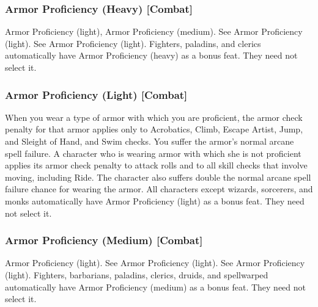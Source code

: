 \subsubsection{Armor Proficiency (Heavy) [Combat]}
 Armor Proficiency (light), Armor Proficiency (medium).
 See Armor Proficiency (light).
 See Armor Proficiency (light).
 Fighters, paladins, and clerics automatically have Armor Proficiency (heavy) as a bonus feat. They need not select it.

\subsubsection{Armor Proficiency (Light) [Combat]}
 When you wear a type of armor with which you are proficient, the armor check penalty for that armor applies only to Acrobatics, Climb, Escape Artist, Jump, and Sleight of Hand, and Swim checks. You suffer the armor's normal arcane spell failure.
 A character who is wearing armor with which she is not proficient applies its armor check penalty to attack rolls and to all skill checks that involve moving, including Ride. The character also suffers double the normal arcane spell failure chance for wearing the armor.
 All characters except wizards, sorcerers, and monks automatically have Armor Proficiency (light) as a bonus feat. They need not select it.

\subsubsection{Armor Proficiency (Medium) [Combat]}
 Armor Proficiency (light).
 See Armor Proficiency (light).
 See Armor Proficiency (light).
 Fighters, barbarians, paladins, clerics, druids, and spellwarped automatically have Armor Proficiency (medium) as a bonus feat. They need not select it.


